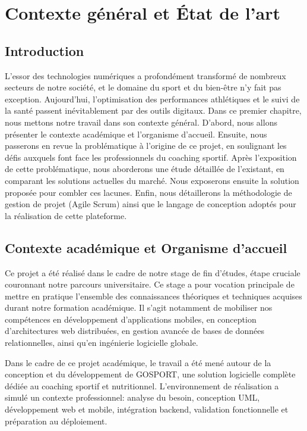 
\chapter{Contexte général et État de l'art} 
\minitoc

\section{Introduction}
L'essor des technologies numériques a profondément transformé de nombreux secteurs de notre société, et le domaine du sport et du bien-être n'y fait pas exception. Aujourd'hui, l'optimisation des performances athlétiques et le suivi de la santé passent inévitablement par des outils digitaux. Dans ce premier chapitre, nous mettons notre travail dans son contexte général. D’abord, nous allons présenter le contexte académique et l'organisme d'accueil. Ensuite, nous passerons en revue la problématique à l'origine de ce projet, en soulignant les défis auxquels font face les professionnels du coaching sportif. Après l'exposition de cette problématique, nous aborderons une étude détaillée de l’existant, en comparant les solutions actuelles du marché. Nous exposerons ensuite la solution proposée pour combler ces lacunes. Enfin, nous détaillerons la méthodologie de gestion de projet (Agile Scrum) ainsi que le langage de conception adoptés pour la réalisation de cette plateforme.

\section{Contexte académique et Organisme d'accueil}
Ce projet a été réalisé dans le cadre de notre stage de fin d'études, étape cruciale couronnant notre parcours universitaire. Ce stage a pour vocation principale de mettre en pratique l'ensemble des connaissances théoriques et techniques acquises durant notre formation académique. Il s'agit notamment de mobiliser nos compétences en développement d'applications mobiles, en conception d'architectures web distribuées, en gestion avancée de bases de données relationnelles, ainsi qu'en ingénierie logicielle globale.

Dans le cadre de ce projet académique, le travail a été mené autour de la conception et du développement de GOSPORT, une solution logicielle complète dédiée au coaching sportif et nutritionnel. L'environnement de réalisation a simulé un contexte professionnel: analyse du besoin, conception UML, développement web et mobile, intégration backend, validation fonctionnelle et préparation au déploiement.

